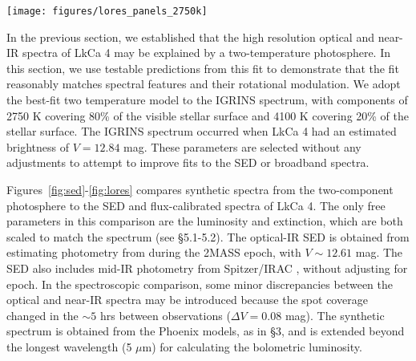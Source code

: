 \documentclass[12pt]{report}
\begin{document}
\begin{figure*}
 \centering
 \texttt{[image: figures/lores\_panels\_2750k]}
 \caption[Flux-calibrated, low resolution spectra of LkCa 4]{Top:  The low-resolution optical/near-IR spectrum of LkCa 4 obtained from Palomar/DBSP and APO/Triplespec on 30 December 2008 (black), compared to a synthetic spectrum of a two temperature photosphere (purple).  The inset shows that the 2750 K (red, 70\% fill factor) and 4100 K (blue, 30\% fill factor) components contribute equally to the near-IR spectrum, but the 4100 K component dominates the blue emission.  The synthetic spectrum is reddened by $A_V=0.4$ mag and scaled to the observed $J$-band spectrum. Bottom:  The low-resolution optical (left) and near-IR (right) spectrum of LkCa 4, compared with a 3900 K photosphere (blue), a 3500 K photosphere, and the two temperature photosphere that best fit the IGRINS spectrum.  The synthetic spectra are scaled separately to the optical spectrum at 0.75 $\mu$m and to the near-IR spectrum at 1.5 $\mu$m.  Warm photospheres accurately reproduce molecular bands at $0.7$ $\mu$m but fail to fit the spectral features at longer wavelengths.  Cooler photospheres predict molecular bands at $<0.7$ $\mu$m that are much deeper than observed.  The two temperature photosphere accurately fits spectral features in the optical and near-IR.}
 \label{fig:lores}
\end{figure*}



In the previous section, we established that the high resolution optical and near-IR spectra of LkCa 4 may be explained by a two-temperature photosphere.  In this section, we use testable predictions from this fit to demonstrate that the fit reasonably matches spectral features and their rotational modulation.  We adopt the best-fit two temperature model to the IGRINS spectrum, with components of 2750 K covering 80\% of the visible stellar surface and 4100 K covering 20\% of the stellar surface.  The IGRINS spectrum occurred when LkCa 4 had an estimated brightness of $V=12.84$ mag.  These parameters are selected without any adjustments to attempt to improve fits to the SED or broadband spectra.

Figures~\ref{fig:sed}-\ref{fig:lores} compares synthetic spectra from the two-component photosphere to the SED and flux-calibrated spectra of LkCa 4.  The only free parameters in this comparison are the luminosity and extinction, which are both scaled to match the spectrum (see \S 5.1-5.2).  The optical-IR SED is obtained from estimating photometry from \citet{grankin08} during the 2MASS epoch, with $V\sim12.61$ mag.  The SED also includes mid-IR photometry from Spitzer/IRAC \citep{hartmann05}, without adjusting for epoch.  In the spectroscopic comparison, some minor discrepancies between the optical and near-IR spectra may be introduced because the spot coverage changed in the $\sim 5$ hrs between observations ($\Delta V=0.08$ mag).  The synthetic spectrum is obtained from the Phoenix models, as in \S 3, and is extended beyond the longest wavelength (5 $\mu$m) for calculating the bolometric luminosity.
\end{document}
